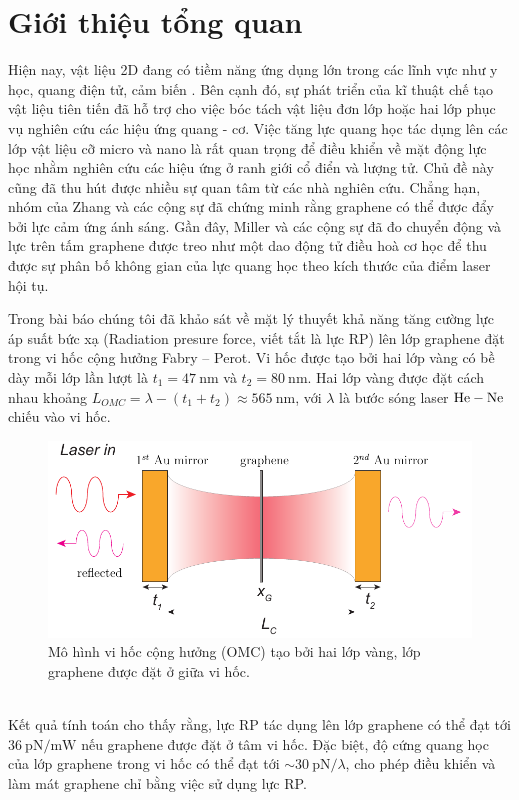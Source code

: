 \documentclass[a4paper]{elsarticle}
\begin{document}
\section{Giới thiệu tổng quan} 

Hiện nay, vật liệu 2D đang có tiềm năng ứng dụng lớn trong các lĩnh vực như y học, quang điện tử, cảm biến \cite{H.Zhang, P.G.Steeneken}. Bên cạnh đó, sự phát triển của kĩ thuật chế tạo vật liệu tiên tiến đã hỗ trợ cho việc bóc tách vật liệu đơn lớp hoặc hai lớp phục vụ nghiên cứu các hiệu ứng quang - cơ. Việc tăng lực quang học tác dụng lên các lớp vật liệu cỡ micro và nano là rất quan trọng để điều khiển về mặt động lực học nhằm nghiên cứu các hiệu ứng ở ranh giới cổ điển và lượng tử. Chủ đề này cũng đã thu hút được nhiều sự quan tâm từ các nhà nghiên cứu. Chẳng hạn, nhóm của Zhang và các cộng sự \cite{Zhang2015} đã chứng minh rằng graphene có thể được đẩy bởi lực cảm ứng ánh sáng. Gần đây, Miller và các cộng sự \cite{Miller} đã đo chuyển động và lực trên tấm graphene được treo như một dao động tử điều hoà cơ học để thu được sự phân bố không gian của lực quang học theo kích thước của điểm laser hội tụ.  

Trong bài báo \cite{ThayVy} chúng tôi đã khảo sát về mặt lý thuyết khả năng tăng cường lực áp suất bức xạ (Radiation presure force, viết tắt là lực RP) lên lớp graphene đặt trong vi hốc cộng hưởng Fabry – Perot. Vi hốc được tạo bởi hai lớp vàng có bề dày mỗi lớp lần lượt là $t_1=\SI{47}{\nano\meter}$ và $t_2=\SI{80}{\nano\meter}$. Hai lớp vàng được đặt cách nhau khoảng $L_{OMC}=\lambda-\left(t_1+t_2\right)\approx\SI{565}{\nano\meter}$, với $\lambda$ là bước sóng laser $\ce{He}-\ce{Ne}$ chiếu vào vi hốc. 
\begin{figure}[h]
	\centering
	\includegraphics[width=0.8\linewidth]{figs/Hinh1}
	\caption{Mô hình vi hốc cộng hưởng (OMC) tạo bởi hai lớp vàng, lớp graphene được đặt ở giữa vi hốc.}
	\label{fig:1}
\end{figure}\\
Kết quả tính toán cho thấy rằng, lực RP tác dụng lên lớp graphene có thể đạt tới $\SI{36}{\pico\newton/\milli\watt}$ nếu graphene được đặt ở tâm vi hốc. Đặc biệt, độ cứng quang học của lớp graphene trong vi hốc có thể đạt tới $\sim\SI{30}{\pico\newton}/\lambda$, cho phép điều khiển và làm mát graphene chỉ bằng việc sử dụng lực RP.
\end{document}

